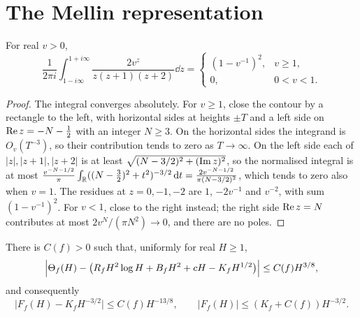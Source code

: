 \section{The Mellin representation}

\begin{lemma}\label{lem:kernel}
For real $v>0$,
\[
\frac1{2\pi i}\int_{1-i\infty}^{1+i\infty}\frac{2v^z}{z(z+1)(z+2)}\dd z=\begin{cases}(1-v^{-1})^2,&v\ge1,\\0,&0<v<1.\end{cases}
\]
\end{lemma}

\begin{proof}
The integral converges absolutely. For $v\ge1$, close the contour by a rectangle to the left, with horizontal sides at heights $\pm T$ and a left side on $\operatorname{Re} z=-N-\frac12$ with an integer $N\ge3$. On the horizontal sides the integrand is $O_v(T^{-3})$, so their contribution tends to zero as $T\to\infty$. On the left side each of $|z|,|z+1|,|z+2|$ is at least $\sqrt{(N-3/2)^2+(\operatorname{Im} z)^2}$, so the normalised integral is at most $\frac{v^{-N-1/2}}\pi\int_{\mathbb R}((N-\frac32)^2+t^2)^{-3/2}\,\mathrm d t=\frac{2v^{-N-1/2}}{\pi(N-3/2)^2}$, which tends to zero also when $v=1$. The residues at $z=0,-1,-2$ are $1$, $-2v^{-1}$ and $v^{-2}$, with sum $(1-v^{-1})^2$. For $v<1$, close to the right instead; the right side $\operatorname{Re} z=N$ contributes at most $2v^N/(\pi N^2)\to0$, and there are no poles.
\end{proof}

\begin{proposition}\label{prop:Theta}
There is $C(f)>0$ such that, uniformly for real $H\ge1$,
\begin{equation}\label{eq:Theta}
\Bigl|\Theta_f(H)-\bigl(R_fH^2\log H+B_fH^2+cH-K_fH^{1/2}\bigr)\Bigr|\le C(f)H^{3/8},
\end{equation}
and consequently
\begin{equation}\label{eq:F-asym}
\bigl|F_f(H)-K_fH^{-3/2}\bigr|\le C(f)H^{-13/8},\qquad|F_f(H)|\le(K_f+C(f))H^{-3/2}.
\end{equation}
\end{proposition}

